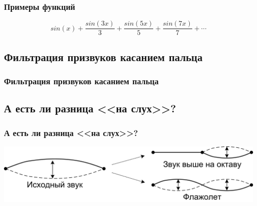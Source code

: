 \begin{frame}
    \frametitle{Примеры функций}

	\[
		sin(x) + \frac{sin(3x)}{3} + \frac{sin(5x)}{5} + \frac{sin(7x)}{7} + \cdots
	\]
\end{frame}


\subsection{Фильтрация призвуков касанием пальца}


\begin{frame}
    \frametitle{Фильтрация призвуков касанием пальца}

    \begin{center}
    \end{center}
\end{frame}


\subsection{А есть ли разница <<на слух>>?}

\begin{frame}
    \frametitle{А есть ли разница <<на слух>>?}

    \begin{center}
        \includegraphics[width=\textwidth]{figs/string-flagol-vs-octave}
    \end{center}
\end{frame}


